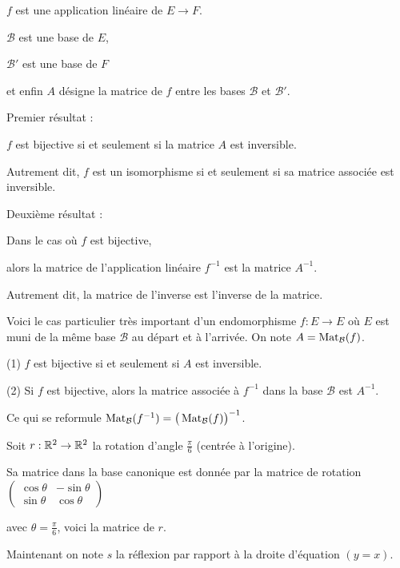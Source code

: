 $f$ est une application linéaire de $E \to F$. 

$\mathcal{B}$ est une base de $E$,


$\mathcal{B}'$ est une base de $F$ 

et enfin $A$ désigne la matrice de $f$ entre les bases $\mathcal{B}$ et $\mathcal{B}'$.


\change
Premier résultat :

$f$ est bijective si et seulement si la matrice $A$ est inversible.

  Autrement dit, $f$ est un isomorphisme si et seulement si sa matrice associée 
   est inversible.

\change
Deuxième résultat :

  Dans le cas où $f$ est bijective, 
  
  alors la matrice de l'application linéaire
  $f^{-1}$ est la matrice $A^{-1}$. 
  
  \change
  Autrement dit, la matrice de l'inverse est l'inverse de la matrice.
  
 

\diapo

Voici le cas particulier très important d'un endomorphisme $f : E \to E$ où
$E$ est muni de la même base $\mathcal{B}$ au départ et à l'arrivée. On note $A = \mathop{\mathrm{Mat}}\nolimits_{\mathcal{B}}(f)$.

\change
(1) $f$ est bijective si et seulement si $A$ est inversible.
  
(2) Si $f$ est bijective, alors la matrice associée à $f^{-1}$ 
dans la base $\mathcal{B}$ est $A^{-1}$.

\change
Ce qui se reformule 
$\mathop{\mathrm{Mat}}\nolimits_{\mathcal{B}}(f^{-1}) = \big(\mathop{\mathrm{Mat}}\nolimits_{\mathcal{B}}(f) \big)^{-1}$.




\diapo
Soit $r : \mathbb{R}^2 \to \mathbb{R}^2$ la rotation d'angle $\frac\pi6$ (centrée à l'origine).

\change
Sa matrice dans la base canonique est donnée par la matrice de rotation
$
  \begin{pmatrix}
\cos\theta & -\sin\theta\\
\sin\theta & \cos\theta
\end{pmatrix}$

\change
avec $\theta = \frac\pi6$,
voici la matrice de $r$.

\change
Maintenant on note $s$ la réflexion par rapport à la droite d'équation $(y=x)$. 

